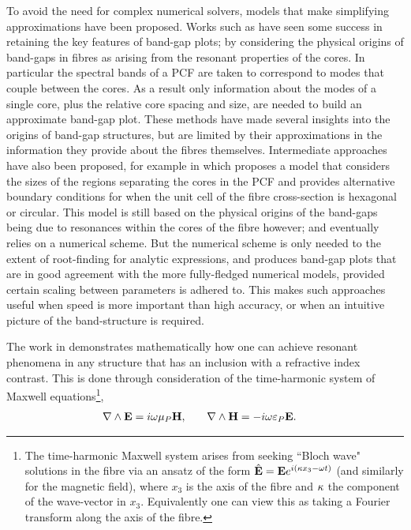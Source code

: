To avoid the need for complex numerical solvers, models that make simplifying approximations have been proposed.
Works such as  have seen some success in retaining the key features of band-gap plots; by considering the physical origins of band-gaps in fibres as arising from the resonant properties of the cores.
In particular the spectral bands of a PCF are taken to correspond to modes that couple between the cores.
As a result only information about the modes of a single core, plus the relative core spacing and size, are needed to build an approximate band-gap plot.
These methods have made several insights into the origins of band-gap structures, but are limited by their approximations in the information they provide about the fibres themselves.
Intermediate approaches have also been proposed, for example in \cite{birks2006approximate} which proposes a model that considers the sizes of the regions separating the cores in the PCF and provides alternative boundary conditions for when the unit cell of the fibre cross-section is hexagonal or circular.
This model is still based on the physical origins of the band-gaps being due to resonances within the cores of the fibre however; and eventually relies on a numerical scheme.
But the numerical scheme is only needed to the extent of root-finding for analytic expressions, and produces band-gap plots that are in good agreement with the more fully-fledged numerical models, provided certain scaling between parameters is adhered to.
This makes such approaches useful when speed is more important than high accuracy, or when an intuitive picture of the band-structure is required. \newline

The work in \cite{cooper2014band} demonstrates mathematically how one can achieve resonant phenomena in any structure that has an inclusion with a refractive index contrast.
This is done through consideration of the time-harmonic system of Maxwell equations\footnote{The time-harmonic Maxwell system arises from seeking ``Bloch wave" solutions in the fibre via an ansatz of the form $\hat{\mathbf{E}}=\mathbf{E}e^{i\left( \kappa x_3-\omega t \right)}$ (and similarly for the magnetic field), where $x_3$ is the axis of the fibre and $\kappa$ the component of the wave-vector in $x_3$.
Equivalently one can view this as taking a Fourier transform along the axis of the fibre.},
\begin{align*}
	\nabla\wedge\mathbf{E} &= i\omega\mu_{P}\mathbf{H}, &\quad \nabla\wedge\mathbf{H} &= -i\omega\varepsilon_{P}\mathbf{E}.
\end{align*}

